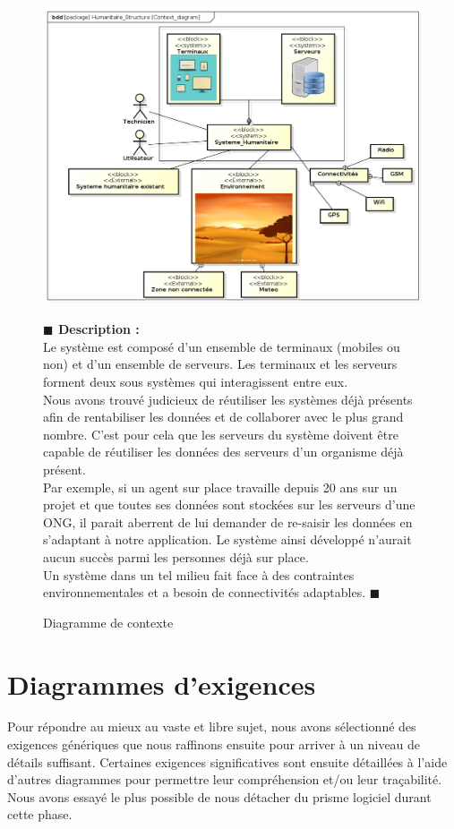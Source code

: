 \documentclass[11pt, titlepage]{report}
\newcommand{\debutDescription}{\noindent\textbf{\textcolor{DescriptionColor}{$\blacksquare$  Description : \\}}}
\newcommand{\finDescription}{\noindent\textcolor{DescriptionColor}{$\blacksquare$}}
\begin{document}
\begin{figure}[h!]
\begin{center}
\includegraphics[scale=.5]{../images/diagrammes/sysml/contexte/context_diagram.png}
\caption{Diagramme de contexte}
\end{center}
\debutDescription
Le système est composé d'un ensemble de terminaux (mobiles ou non) et d'un ensemble de serveurs. Les terminaux et les serveurs forment deux sous systèmes qui interagissent entre eux.\\
Nous avons trouvé judicieux de réutiliser les systèmes déjà présents afin de rentabiliser les données et de collaborer avec le plus grand nombre. C'est pour cela que les serveurs du système doivent être capable de réutiliser les données des serveurs d'un organisme déjà présent.\\Par exemple, si un agent sur place travaille depuis 20 ans sur un projet et que toutes ses données sont stockées sur les serveurs d'une ONG, il parait aberrent de lui demander de re-saisir les données en s'adaptant à notre application. Le système ainsi développé n'aurait aucun succès parmi les personnes déjà sur place.\\
Un système dans un tel milieu fait face à des contraintes environnementales et a besoin de connectivités adaptables.
\finDescription
\end{figure}


\clearpage
\section{Diagrammes d'exigences}
Pour répondre au mieux au vaste et libre sujet, nous avons sélectionné des exigences génériques que nous raffinons ensuite pour arriver à un niveau de détails suffisant. Certaines exigences significatives sont ensuite détaillées à l'aide d'autres diagrammes pour permettre leur compréhension et/ou leur traçabilité. Nous avons essayé le plus possible de nous détacher du prisme logiciel durant cette phase.
\end{document}
